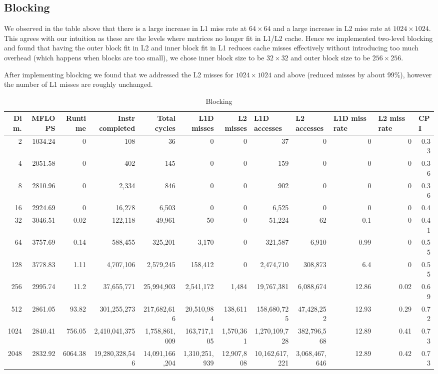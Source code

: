 \documentclass{article}
\begin{document}
\subsection{Blocking}
We observed in the table above that there is a large increase in L1 miss rate at $64 \times 64$ and a large increase in L2 miss rate at $1024\times1024$.  This agrees with our intuition as these are the levels where matrices no longer fit in L1/L2 cache.  Hence we implemented two-level blocking and found that having the outer block fit in L2 and inner block fit in L1 reduces cache misses effectively without introducing too much overhead (which happens when blocks are too small), we chose inner block size to be $32\times32$ and outer block size to be $256\times256$.

After implementing blocking we found that we addressed the L2 misses for $1024\times1024$ and above (reduced misses by about 99\%), however the number of L1 misses are roughly unchanged.
\begin{table}[htbp]
\tiny
\caption{Blocking}
\begin{tabular}{|r|r|r|r|r|r|r|r|r|r|r|r|}
\hline
Dim. &   MFLOPS &     Runtime & Instr completed & Total cycles & L1D misses & L2 misses & \multicolumn{1}{l|}{L1D accesses} & \multicolumn{1}{l|}{ L2 accesses} & \multicolumn{1}{l|}{L1D miss rate} & \multicolumn{1}{l|}{L2 miss rate} & \multicolumn{1}{l|}{CPI} \\ \hline
2 & 1034.24 & 0 & 108 & 36 & 0 & 0 & 37 & 0 & 0 & 0 & 0.33 \\ \hline
4 & 2051.58 & 0 & 402 & 145 & 0 & 0 & 159 & 0 & 0 & 0 & 0.36 \\ \hline
8 & 2810.96 & 0 & 2,334 & 846 & 0 & 0 & 902 & 0 & 0 & 0 & 0.36 \\ \hline
16 & 2924.69 & 0 & 16,278 & 6,503 & 0 & 0 & 6,525 & 0 & 0 & 0 & 0.4 \\ \hline
32 & 3046.51 & 0.02 & 122,118 & 49,961 & 50 & 0 & 51,224 & 62 & 0.1 & 0 & 0.41 \\ \hline
64 & 3757.69 & 0.14 & 588,455 & 325,201 & 3,170 & 0 & 321,587 & 6,910 & 0.99 & 0 & 0.55 \\ \hline
128 & 3778.83 & 1.11 & 4,707,106 & 2,579,245 & 158,412 & 0 & 2,474,710 & 308,873 & 6.4 & 0 & 0.55 \\ \hline
256 & 2995.74 & 11.2 & 37,655,771 & 25,994,903 & 2,541,172 & 1,484 & 19,767,381 & 6,088,674 & 12.86 & 0.02 & 0.69 \\ \hline
512 & 2861.05 & 93.82 & 301,255,273 & 217,682,616 & 20,510,984 & 138,611 & 158,680,725 & 47,428,252 & 12.93 & 0.29 & 0.72 \\ \hline
1024 & 2840.41 & 756.05 & 2,410,041,375 & 1,758,861,009 & 163,717,105 & 1,570,361 & 1,270,109,728 & 382,796,568 & 12.89 & 0.41 & 0.73 \\ \hline
2048 & 2832.92 & 6064.38 & 19,280,328,546 & 14,091,166,204 & 1,310,251,939 & 12,907,808 & 10,162,617,221 & 3,068,467,646 & 12.89 & 0.42 & 0.73 \\ \hline
\end{tabular}
\label{}
\end{table}
\end{document}
